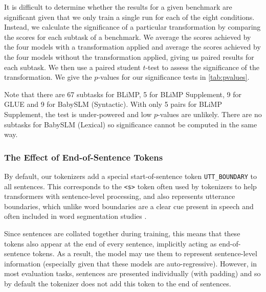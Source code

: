 It is difficult to determine whether the results for a given benchmark are significant given that we only train a single run for each of the eight conditions. Instead, we calculate the significance of a particular transformation by comparing the scores for each subtask of a benchmark. We average the scores achieved by the four models with a transformation applied and average the scores achieved by the four models without the transformation applied, giving us paired results for each subtask. We then use a paired student $t$-test to assess the significance of the transformation. We give the $p$-values for our significance tests in \cref{tab:pvalues}.

Note that there are 67 subtasks for BLiMP, 5 for BLiMP Supplement, 9 for GLUE and 9 for BabySLM (Syntactic). With only 5 pairs for BLiMP Supplement, 
the test is under-powered and low $p$-values are unlikely. There are no subtasks for BabySLM (Lexical) so significance cannot be computed in the same way. 


\subsubsection{The Effect of End-of-Sentence Tokens}
\label{sec:endofsentence}

By default, our tokenizers add a special start-of-sentence token \texttt{UTT\_BOUNDARY} to all sentences. This corresponds to the \texttt{<s>} token often used by tokenizers to help transformers with sentence-level processing, and also represents utterance boundaries, which unlike word boundaries are a clear cue present in speech and often included in word segmentation studies \citep{feliciano-de-faria-2019-utterance-boundaries}. 

Since sentences are collated together during training, this means that these tokens also appear at the end of every sentence, implicitly acting as end-of-sentence tokens. As a result, the model may use them to represent sentence-level information (especially given that these models are auto-regressive). However, in most evaluation tasks, sentences are presented individually (with padding) and so by default the tokenizer does not add this token to the end of sentences. 

